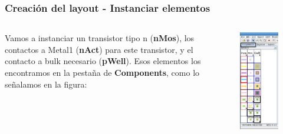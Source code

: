 \documentclass{beamer}
\begin{document}
\begin{frame}
\frametitle{Creación del layout - Instanciar elementos}
\begin{columns}[c]
Vamos a instanciar un transistor tipo n (\textbf{nMos}), los contactos a Metal1 (\textbf{nAct}) para este transistor, y el contacto a bulk necesario (\textbf{pWell}). Esos elementos los encontramos en la pestaña de \textbf{Components}, como lo señalamos en la figura:
\begin{figure}
  \includegraphics[width=0.69\linewidth]{figuras/edicionElectric-6bbb.png}
\end{figure}
\end{columns}
\end{frame}
\end{document}
